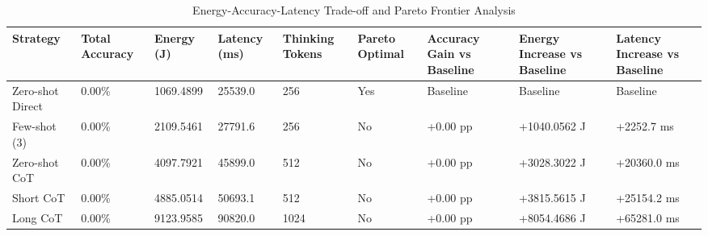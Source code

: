 \begin{table}
\caption{Energy-Accuracy-Latency Trade-off and Pareto Frontier Analysis}
\label{tab:tradeoff_comparison}
\begin{tabular}{lllllllll}
\toprule
Strategy & Total Accuracy & Energy (J) & Latency (ms) & Thinking Tokens & Pareto Optimal & Accuracy Gain vs Baseline & Energy Increase vs Baseline & Latency Increase vs Baseline \\
\midrule
Zero-shot Direct & 0.00\% & 1069.4899 & 25539.0 & 256 & Yes & Baseline & Baseline & Baseline \\
Few-shot (3) & 0.00\% & 2109.5461 & 27791.6 & 256 & No & +0.00 pp & +1040.0562 J & +2252.7 ms \\
Zero-shot CoT & 0.00\% & 4097.7921 & 45899.0 & 512 & No & +0.00 pp & +3028.3022 J & +20360.0 ms \\
Short CoT & 0.00\% & 4885.0514 & 50693.1 & 512 & No & +0.00 pp & +3815.5615 J & +25154.2 ms \\
Long CoT & 0.00\% & 9123.9585 & 90820.0 & 1024 & No & +0.00 pp & +8054.4686 J & +65281.0 ms \\
\bottomrule
\end{tabular}
\end{table}
